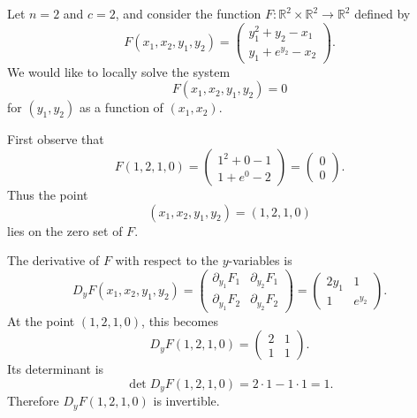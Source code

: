 	\begin{example}
	  \label{ex:a-system-of-two-equations}
		Let $n=2$ and $c=2$, and consider the function
		$F:\mathbb{R}^2 \times \mathbb{R}^2 \to \mathbb{R}^2$ defined by
		\begin{equation}
			F(x_1,x_2,y_1,y_2)
			=
			\begin{pmatrix}
				y_1^2+y_2-x_1 \\
				y_1+e^{y_2}-x_2
			\end{pmatrix}.
		\end{equation}
		We would like to locally solve the system
		\begin{equation}
			F(x_1,x_2,y_1,y_2)=0
		\end{equation}
		for $(y_1,y_2)$ as a function of $(x_1,x_2)$.

		First observe that
		\begin{equation}
			F(1,2,1,0)
			=
			\begin{pmatrix}
				1^2+0-1 \\
				1+e^0-2
			\end{pmatrix}
			=
			\begin{pmatrix}
				0 \\
				0
			\end{pmatrix}.
		\end{equation}
		Thus the point
		\begin{equation}
			(x_1,x_2,y_1,y_2) = (1,2,1,0)
		\end{equation}
		lies on the zero set of $F$.

		The derivative of $F$ with respect to the $y$-variables is
		\begin{equation}
			D_yF(x_1,x_2,y_1,y_2)
			=
			\begin{pmatrix}
				\partial_{y_1}F_1 & \partial_{y_2}F_1 \\
				\partial_{y_1}F_2 & \partial_{y_2}F_2
			\end{pmatrix}
			=
			\begin{pmatrix}
				2y_1 & 1 \\
				1 & e^{y_2}
			\end{pmatrix}.
		\end{equation}
		At the point $(1,2,1,0)$, this becomes
		\begin{equation}
			D_yF(1,2,1,0)
			=
			\begin{pmatrix}
				2 & 1 \\
				1 & 1
			\end{pmatrix}.
		\end{equation}
		Its determinant is
		\begin{equation}
			\det D_yF(1,2,1,0)
			=
			2\cdot 1 - 1\cdot 1
			=
			1.
		\end{equation}
		Therefore $D_yF(1,2,1,0)$ is invertible.


\end{example}

